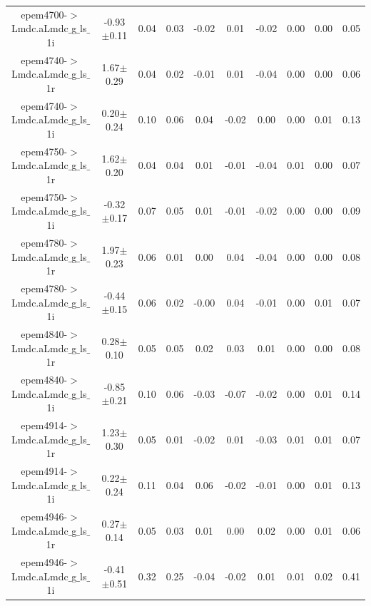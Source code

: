\begin{table}[H]
{\begin{tabular}{c|c|ccccccc|c}
epem4700-$>$Lmdc.aLmdc$\_$g$\_$ls$\_$1i & -0.93$\pm$0.11 & 0.04 & 0.03 & -0.02 & 0.01 & -0.02 & 0.00 & 0.00 & 0.05\\
epem4740-$>$Lmdc.aLmdc$\_$g$\_$ls$\_$1r & 1.67$\pm$0.29 & 0.04 & 0.02 & -0.01 & 0.01 & -0.04 & 0.00 & 0.00 & 0.06\\
epem4740-$>$Lmdc.aLmdc$\_$g$\_$ls$\_$1i & 0.20$\pm$0.24 & 0.10 & 0.06 & 0.04 & -0.02 & 0.00 & 0.00 & 0.01 & 0.13\\
epem4750-$>$Lmdc.aLmdc$\_$g$\_$ls$\_$1r & 1.62$\pm$0.20 & 0.04 & 0.04 & 0.01 & -0.01 & -0.04 & 0.01 & 0.00 & 0.07\\
epem4750-$>$Lmdc.aLmdc$\_$g$\_$ls$\_$1i & -0.32$\pm$0.17 & 0.07 & 0.05 & 0.01 & -0.01 & -0.02 & 0.00 & 0.00 & 0.09\\
epem4780-$>$Lmdc.aLmdc$\_$g$\_$ls$\_$1r & 1.97$\pm$0.23 & 0.06 & 0.01 & 0.00 & 0.04 & -0.04 & 0.00 & 0.00 & 0.08\\
epem4780-$>$Lmdc.aLmdc$\_$g$\_$ls$\_$1i & -0.44$\pm$0.15 & 0.06 & 0.02 & -0.00 & 0.04 & -0.01 & 0.00 & 0.01 & 0.07\\
epem4840-$>$Lmdc.aLmdc$\_$g$\_$ls$\_$1r & 0.28$\pm$0.10 & 0.05 & 0.05 & 0.02 & 0.03 & 0.01 & 0.00 & 0.00 & 0.08\\
epem4840-$>$Lmdc.aLmdc$\_$g$\_$ls$\_$1i & -0.85$\pm$0.21 & 0.10 & 0.06 & -0.03 & -0.07 & -0.02 & 0.00 & 0.01 & 0.14\\
epem4914-$>$Lmdc.aLmdc$\_$g$\_$ls$\_$1r & 1.23$\pm$0.30 & 0.05 & 0.01 & -0.02 & 0.01 & -0.03 & 0.01 & 0.01 & 0.07\\
epem4914-$>$Lmdc.aLmdc$\_$g$\_$ls$\_$1i & 0.22$\pm$0.24 & 0.11 & 0.04 & 0.06 & -0.02 & -0.01 & 0.00 & 0.01 & 0.13\\
epem4946-$>$Lmdc.aLmdc$\_$g$\_$ls$\_$1r & 0.27$\pm$0.14 & 0.05 & 0.03 & 0.01 & 0.00 & 0.02 & 0.00 & 0.01 & 0.06\\
epem4946-$>$Lmdc.aLmdc$\_$g$\_$ls$\_$1i & -0.41$\pm$0.51 & 0.32 & 0.25 & -0.04 & -0.02 & 0.01 & 0.01 & 0.02 & 0.41\\
\hline\hline
\end{tabular}
}

\end{table}

